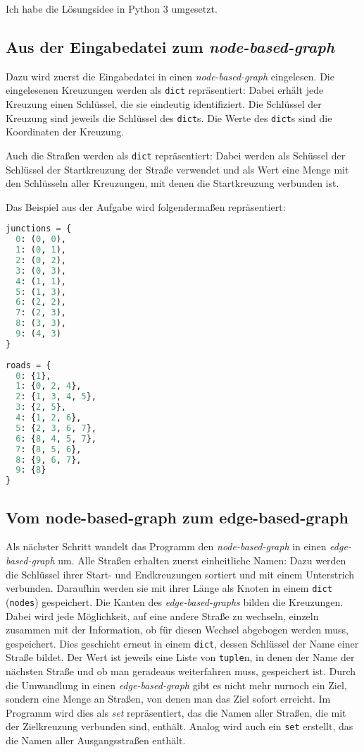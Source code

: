\documentclass[a4paper,10pt,ngerman]{scrartcl}
\begin{document}
Ich habe die Lösungsidee in Python 3 umgesetzt.

\subsection{Aus der Eingabedatei zum \textit{node-based-graph}}

Dazu wird zuerst die Eingabedatei in einen \textit{node-based-graph} eingelesen.
Die eingelesenen Kreuzungen werden als \texttt{dict} repräsentiert: Dabei erhält jede Kreuzung einen Schlüssel, die sie eindeutig identifiziert.
Die Schlüssel der Kreuzung sind jeweils die Schlüssel des \texttt{dict}s.
Die Werte des \texttt{dict}s sind die Koordinaten der Kreuzung.

Auch die Straßen werden als \texttt{dict} repräsentiert: Dabei werden als Schüssel der Schlüssel der Startkreuzung der Straße verwendet und als Wert eine Menge mit den Schlüsseln aller Kreuzungen, mit denen die Startkreuzung verbunden ist.

Das Beispiel aus der Aufgabe wird folgendermaßen repräsentiert:

\begin{lstlisting}[language=Python]
junctions = {
  0: (0, 0), 
  1: (0, 1), 
  2: (0, 2), 
  3: (0, 3), 
  4: (1, 1), 
  5: (1, 3), 
  6: (2, 2), 
  7: (2, 3), 
  8: (3, 3), 
  9: (4, 3)
} 
 
roads = {
  0: {1}, 
  1: {0, 2, 4}, 
  2: {1, 3, 4, 5}, 
  3: {2, 5}, 
  4: {1, 2, 6}, 
  5: {2, 3, 6, 7}, 
  6: {8, 4, 5, 7}, 
  7: {8, 5, 6}, 
  8: {9, 6, 7}, 
  9: {8}
}
\end{lstlisting}

\subsection{Vom node-based-graph zum edge-based-graph}
Als nächster Schritt wandelt das Programm den \textit{node-based-graph} in einen \textit{edge-based-graph} um.
Alle Straßen erhalten zuerst einheitliche Namen: Dazu werden die Schlüssel ihrer Start- und Endkreuzungen sortiert und mit einem Unterstrich verbunden.
Daraufhin werden sie mit ihrer Länge als Knoten in einem \texttt{dict} (\texttt{nodes}) gespeichert.
Die Kanten des \textit{edge-based-graphs} bilden die Kreuzungen.
Dabei wird jede Möglichkeit, auf eine andere Straße zu wechseln, einzeln zusammen mit der Information, ob für diesen Wechsel abgebogen werden muss, gespeichert.
Dies geschieht erneut in einem \texttt{dict}, dessen Schlüssel der Name einer Straße bildet.
Der Wert ist jeweils eine Liste von \texttt{tuple}n, in denen der Name der nächsten Straße und ob man geradeaus weiterfahren muss, gespeichert ist.
Durch die Umwandlung in einen \textit{edge-based-graph} gibt es nicht mehr nurnoch ein Ziel, sondern eine Menge an Straßen, von denen man das Ziel sofort erreicht.
Im Programm wird dies als \textit{set} repräsentiert, das die Namen aller Straßen, die mit der Zielkreuzung verbunden sind, enthält.
Analog wird auch ein \texttt{set} erstellt, das die Namen aller Ausgangsstraßen enthält.
\end{document}

